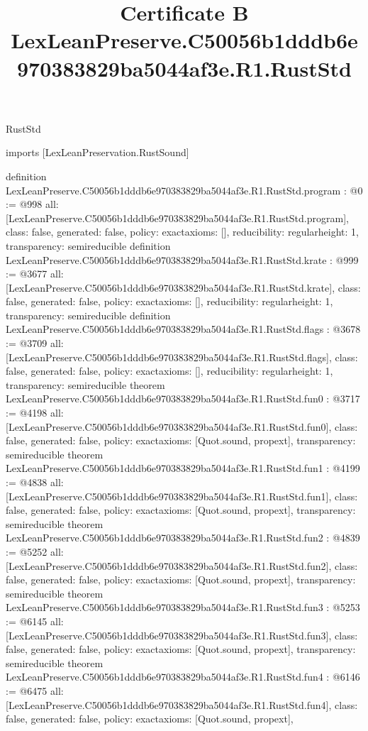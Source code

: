 \begin{lexlean}{RustStd}
\title{Certificate B LexLeanPreserve.C50056b1dddb6e970383829ba5044af3e.R1.RustStd}
\begin{coremodule}
imports [LexLeanPreservation.RustSound]

definition LexLeanPreserve.C50056b1dddb6e970383829ba5044af3e.R1.RustStd.program : @0 := @998 {
  all: [LexLeanPreserve.C50056b1dddb6e970383829ba5044af3e.R1.RustStd.program],
  class: false,
  generated: false,
  policy: exact{axioms: []},
  reducibility: regular{height: 1},
  transparency: semireducible
}
definition LexLeanPreserve.C50056b1dddb6e970383829ba5044af3e.R1.RustStd.krate : @999 := @3677 {
  all: [LexLeanPreserve.C50056b1dddb6e970383829ba5044af3e.R1.RustStd.krate],
  class: false,
  generated: false,
  policy: exact{axioms: []},
  reducibility: regular{height: 1},
  transparency: semireducible
}
definition LexLeanPreserve.C50056b1dddb6e970383829ba5044af3e.R1.RustStd.flags : @3678 := @3709 {
  all: [LexLeanPreserve.C50056b1dddb6e970383829ba5044af3e.R1.RustStd.flags],
  class: false,
  generated: false,
  policy: exact{axioms: []},
  reducibility: regular{height: 1},
  transparency: semireducible
}
theorem LexLeanPreserve.C50056b1dddb6e970383829ba5044af3e.R1.RustStd.fun0 : @3717 := @4198 {
  all: [LexLeanPreserve.C50056b1dddb6e970383829ba5044af3e.R1.RustStd.fun0],
  class: false,
  generated: false,
  policy: exact{axioms: [Quot.sound, propext]},
  transparency: semireducible
}
theorem LexLeanPreserve.C50056b1dddb6e970383829ba5044af3e.R1.RustStd.fun1 : @4199 := @4838 {
  all: [LexLeanPreserve.C50056b1dddb6e970383829ba5044af3e.R1.RustStd.fun1],
  class: false,
  generated: false,
  policy: exact{axioms: [Quot.sound, propext]},
  transparency: semireducible
}
theorem LexLeanPreserve.C50056b1dddb6e970383829ba5044af3e.R1.RustStd.fun2 : @4839 := @5252 {
  all: [LexLeanPreserve.C50056b1dddb6e970383829ba5044af3e.R1.RustStd.fun2],
  class: false,
  generated: false,
  policy: exact{axioms: [Quot.sound, propext]},
  transparency: semireducible
}
theorem LexLeanPreserve.C50056b1dddb6e970383829ba5044af3e.R1.RustStd.fun3 : @5253 := @6145 {
  all: [LexLeanPreserve.C50056b1dddb6e970383829ba5044af3e.R1.RustStd.fun3],
  class: false,
  generated: false,
  policy: exact{axioms: [Quot.sound, propext]},
  transparency: semireducible
}
theorem LexLeanPreserve.C50056b1dddb6e970383829ba5044af3e.R1.RustStd.fun4 : @6146 := @6475 {
  all: [LexLeanPreserve.C50056b1dddb6e970383829ba5044af3e.R1.RustStd.fun4],
  class: false,
  generated: false,
  policy: exact{axioms: [Quot.sound, propext]},
}
\end{coremodule}
\end{lexlean}
